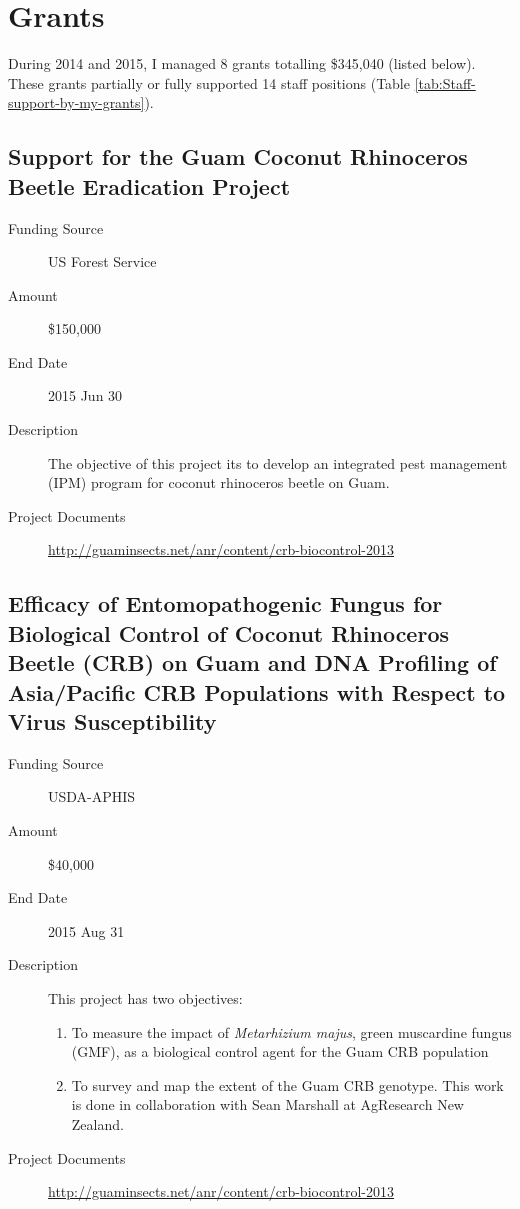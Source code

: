\documentclass[12pt,oneside,english]{scrbook}
\begin{document}
\section{Grants}

During 2014 and 2015, I managed 8 grants totalling \$345,040 (listed below). These grants partially or fully supported 14 staff positions (Table \ref{tab:Staff-support-by-my-grants}).

\subsection{Support for the Guam Coconut Rhinoceros Beetle Eradication Project}

\begin{description}
	\item[Funding Source] US Forest Service
	\item[Amount] \$150,000
	\item[End Date] 2015 Jun 30
	\item[Description] The objective of this project its to develop  an integrated pest management (IPM) program for coconut rhinoceros beetle on Guam.
	\item[Project Documents] \url{http://guaminsects.net/anr/content/crb-biocontrol-2013}
\end{description}

\subsection{Efficacy of Entomopathogenic Fungus for Biological Control of Coconut Rhinoceros Beetle (CRB) on Guam and DNA Profiling of Asia/Pacific CRB Populations with Respect to Virus Susceptibility
}
\begin{description}
	\item[Funding Source] USDA-APHIS
	\item[Amount] \$40,000
	\item[End Date] 2015 Aug 31
	\item[Description] This project has two objectives:
	\begin{enumerate}
		\item To measure the impact of \textit{Metarhizium majus}, green muscardine fungus (GMF), as a biological control agent for the Guam CRB population
		\item To survey and map the extent of the Guam CRB genotype. This work is done in collaboration with Sean Marshall at AgResearch New Zealand.
	\end{enumerate} 
	\item[Project Documents] \url{http://guaminsects.net/anr/content/crb-biocontrol-2013}
\end{description}
\end{document}
